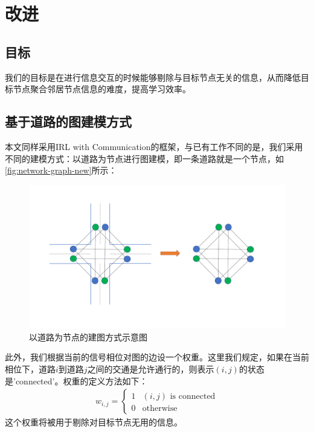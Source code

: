 \section{改进}
\subsection{目标}
我们的目标是在进行信息交互的时候能够剔除与目标节点无关的信息，从而降低目标节点聚合邻居节点信息的难度，提高学习效率。

\subsection{基于道路的图建模方式}
本文同样采用IRL with Communication的框架，与已有工作不同的是，我们采用不同的建模方式：以道路为节点进行图建模，即一条道路就是一个节点，如\autoref{fig:network-graph-new}所示：
\begin{figure}[htb]
  \includegraphics[width=1.2\textwidth]{ppt/graph-modeling.pdf}
  \caption{以道路为节点的建图方式示意图}
  \label{fig:network-graph-new}
\end{figure}

此外，我们根据当前的信号相位对图的边设一个权重。这里我们规定，如果在当前相位下，道路$i$到道路$j$之间的交通是允许通行的，则表示$(i,j)$的状态是'connected'。权重的定义方法如下：
\begin{align}
  w_{i,j} = \begin{cases}
    1 & (i, j) \text{ is connected} \\
    0 & \text{otherwise}
  \end{cases}
\end{align}
这个权重将被用于剔除对目标节点无用的信息。

